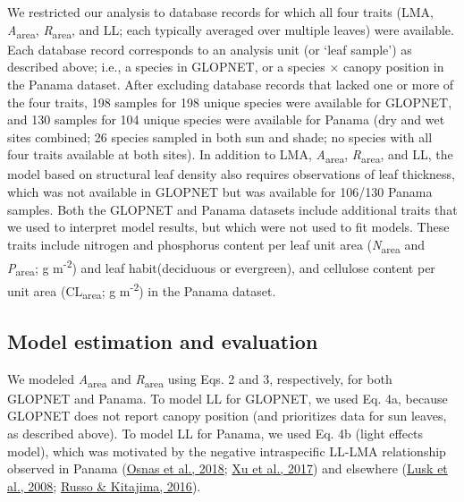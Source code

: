 \documentclass[
  12pt,
  letterpaper,
  DIV=11,
  numbers=noendperiod]{scrartcl}
\begin{document}
We restricted our analysis to database records for which all four traits
(LMA, \emph{A}\textsubscript{area}, \emph{R}\textsubscript{area}, and
LL; each typically averaged over multiple leaves) were available. Each
database record corresponds to an analysis unit (or `leaf sample') as
described above; i.e., a species in GLOPNET, or a species \(\times\)
canopy position in the Panama dataset. After excluding database records
that lacked one or more of the four traits, 198 samples for 198 unique
species were available for GLOPNET, and 130 samples for 104 unique
species were available for Panama (dry and wet sites combined; 26
species sampled in both sun and shade; no species with all four traits
available at both sites). In addition to LMA,
\emph{A}\textsubscript{area}, \emph{R}\textsubscript{area}, and LL, the
model based on structural leaf density also requires observations of
leaf thickness, which was not available in GLOPNET but was available for
106/130 Panama samples. Both the GLOPNET and Panama datasets include
additional traits that we used to interpret model results, but which
were not used to fit models. These traits include nitrogen and
phosphorus content per leaf unit area (\emph{N}\textsubscript{area} and
\emph{P}\textsubscript{area}; g m\textsuperscript{-2}) and leaf
habit(deciduous or evergreen), and cellulose content per unit area
(CL\textsubscript{area}; g m\textsuperscript{-2}) in the Panama dataset.

\hypertarget{model-estimation-and-evaluation}{%
\subsection{Model estimation and
evaluation}\label{model-estimation-and-evaluation}}

We modeled \emph{A}\textsubscript{area} and \emph{R}\textsubscript{area}
using Eqs. 2 and 3, respectively, for both GLOPNET and Panama. To model
LL for GLOPNET, we used Eq. 4a, because GLOPNET does not report canopy
position (and prioritizes data for sun leaves, as described above). To
model LL for Panama, we used Eq. 4b (light effects model), which was
motivated by the negative intraspecific LL-LMA relationship observed in
Panama (\protect\hyperlink{ref-Osnas2018}{Osnas et al., 2018};
\protect\hyperlink{ref-Xu2017}{Xu et al., 2017}) and elsewhere
(\protect\hyperlink{ref-Lusk2008}{Lusk et al., 2008};
\protect\hyperlink{ref-Russo2016}{Russo \& Kitajima, 2016}).
\end{document}
